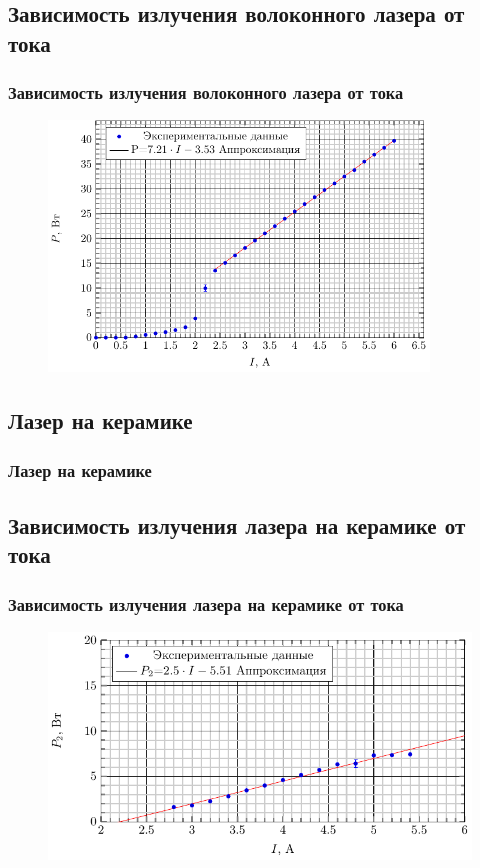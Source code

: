 \documentclass[10pt,pdf,hyperref={unicode}, dvipsnames]{beamer}
\newcommand\frametitless[1]{\subsection{#1}\frametitle{#1}}
\begin{document}
\begin{frame}[t]
	\frametitless{Зависимость излучения волоконного лазера от тока}
		\begin{figure}[tb]
		\centering
		\includegraphics[width=0.9\textwidth]{img/PI}
	\end{figure}
\end{frame}
\begin{frame}[t]
	\frametitless{Лазер на керамике}
	
\end{frame}
\begin{frame}[t]
	\frametitless{Зависимость излучения лазера на керамике от тока}
		\begin{figure}[tb]
		\centering
		\includegraphics[]{img/P2I}
	\end{figure}
\end{frame}
\end{document}
